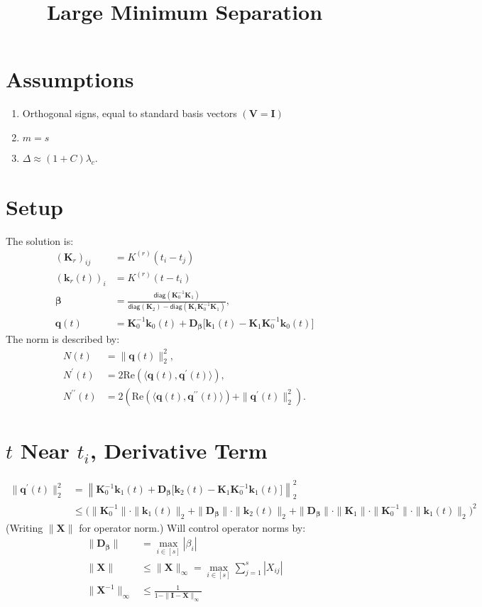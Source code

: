 \documentclass[11pt]{article}
\title{Large Minimum Separation}
\author{}
\newcommand{\ra}{\rangle}
\newcommand{\la}{\langle}
\renewcommand{\Re}{\mathrm{Re}}
\newcommand{\diag}{\mathsf{diag}}
\newcommand{\bbeta}{\bm \beta}
\newcommand{\bD}{\bm D}
\newcommand{\bK}{\bm K}
\newcommand{\bk}{\bm k}
\newcommand{\bV}{\bm V}
\newcommand{\bX}{\bm X}
\newcommand{\bq}{\bm q}
\begin{document}
\maketitle

\noindent

\section{Assumptions}

\begin{enumerate}
\item Orthogonal signs, equal to standard basis vectors $(\bV = \bm I)$
\item $m = s$
\item $\Delta \approx (1 + C)\lambda_c$.
\end{enumerate}

\section{Setup}

\noindent
The solution is:
\begin{align}
  (\bK_r)_{ij} &= K^{(r)}(t_i - t_j) \\
  (\bk_r(t))_i &= K^{(r)}(t - t_i) \\
  \bbeta &= \frac{\diag(\bK_0^{-1}\bK_1)}{\diag(\bK_2) - \diag(\bK_1\bK_0^{-1}\bK_1)}, \\
  \bq(t) &= \bK_0^{-1}\bk_0(t) + \bD_{\bbeta}\bigg[\bk_1(t) - \bK_1\bK_0^{-1}\bk_0(t)\bigg]
\end{align}
The norm is described by:
\begin{align}
  N(t) &= \|\bq(t)\|_2^2, \\
  N^\prime(t) &= 2\Re(\la \bq(t), \bq^\prime(t) \ra), \\
  N^{\prime\prime}(t) &= 2\left(\Re(\la \bq(t), \bq^{\prime\prime}(t) \ra) + \|\bq^\prime(t)\|_2^2\right).
\end{align}

\section{$t$ Near $t_i$, Derivative Term}

\begin{align*}
  \|\bq^\prime(t)\|_2^2
  &= \left\|\bK_0^{-1}\bk_1(t) + \bD_{\bbeta}\bigg[\bk_2(t) - \bK_1\bK_0^{-1}\bk_1(t)\bigg]\right\|_2^2 \\
  &\leq \bigg(\|\bK_0^{-1}\|\cdot \|\bk_1(t)\|_2 + \|\bD_{\bbeta}\|\cdot \|\bk_2(t)\|_2 + \|\bD_{\bbeta}\|\cdot \|\bK_1\| \cdot \|\bK_0^{-1}\| \cdot \|\bk_1(t)\|_2\bigg)^2
\end{align*}
(Writing $\|\bX\|$ for operator norm.)
Will control operator norms by:
\begin{align*}
  \|\bD_{\bbeta}\| &= \max_{i \in [s]} |\beta_i| \\
  \|\bX\| &\leq \|\bX\|_{\infty} = \max_{i \in [s]} \sum_{j = 1}^s |X_{ij}| \\
  \|\bX^{-1}\|_{\infty} &\leq \frac{1}{1 - \|\bm I - \bX\|_{\infty}}
\end{align*}
\end{document}
